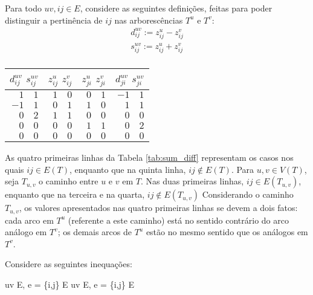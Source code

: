 Para todo $uv, ij \in E$, considere as seguintes definições, feitas
para poder distinguir a pertinência de $ij$ nas arborescências $T^u$ e $T^v$:
\begin{align*}
  d^{u v}_{ij} := z^{u}_{ij} - z^{v}_{ij}\\
  s^{u v}_{ij} := z^{u}_{ij} + z^{v}_{ij}\\
  \end{align*}
\vspace{-1.5cm}
\small
\begin{center}
  \noindent
  \label{tab:sum_diff}
  \medskip
  
\begin{tabular}{|r|r|r|r|}\hline
{$d^{uv}_{ij}$ $s^{uv}_{ij}$} & {$z^{u}_{ij}$ $z^{v}_{ij}$} & {$z^{u}_{ji}$ $z^{v}_{ji}$} & {$d^{uv}_{ji}$ $s^{uv}_{ji}$}
\\ \hline\hline 
$1\quad 1$ & $1\quad 0$ & $0\quad 1$ & $-1\quad 1$ \\
$-1\quad 1$ & $0\quad 1$ & $1\quad 0$ & $1\quad 1$ \\
$0\quad 2$ & $1\quad 1$ & $0\quad 0$ & $0\quad 0$ \\
$0\quad 0$ & $0\quad 0$ & $1\quad 1$ & $0\quad 2$ \\
$0\quad 0$ & $0\quad 0$ & $0\quad 0$ & $0\quad 0$ \\
\hline\hline
\end{tabular}
\end{center}

\bigskip


As quatro primeiras linhas da Tabela \ref{tab:sum_diff} representam
os casos nos quais $ij \in E(T)$, enquanto que na quinta linha,
$ij \notin E(T)$. Para $u,v \in V(T)$, seja $T_{u,v}$ o caminho entre $u$ e $v$
em $T$. Nas duas primeiras linhas, $ij \in E(T_{u,v})$,
enquanto que na terceira e na quarta, $ij \notin
E(T_{u,v})$
  Considerando o caminho $T_{u,v}$, 
  os valores apresentados nas quatro primeiras linhas se devem a dois fatos: 
  cada arco em $T^u$ (referente a este caminho) está no sentido contrário do arco análogo em $T^v$; 
  os demais arcos de $T^u$ estão no mesmo sentido que os análogos em $T^v$.


  \hfill
  
Considere as seguintes inequações:
%
\begin{lpformulation}[]
   {uv \in E, \forall e = \{i,j\} \in E}
   {uv \in E, \forall e = \{i,j\} \in E}
\end{lpformulation}

